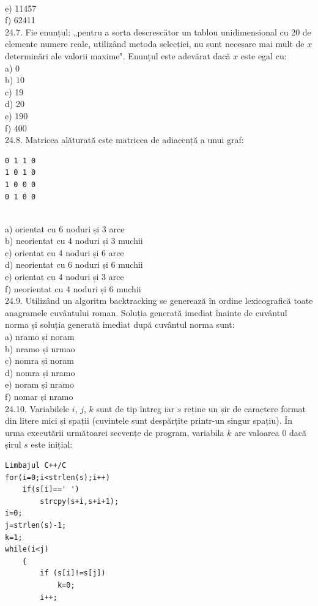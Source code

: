{{\\
e) 11457
\\
f) 62411
\\
24.7. Fie enunțul: „pentru a sorta descrescător un tablou unidimensional cu 20 de elemente numere reale, utilizând metoda selecției, nu sunt necesare mai mult de $x$ determinări ale valorii maxime". Enunțul este adevărat dacă $x$ este egal cu:
\\
a) 0
\\
b) 10
\\
c) 19
\\
d) 20
\\
e) 190
\\
f) 400
\\
24.8. Matricea alăturată este matricea de adiacență a unui graf:
\begin{verbatim}
0 1 1 0
1 0 1 0
1 0 0 0
0 1 0 0
\end{verbatim}
\\
a) orientat cu 6 noduri și 3 arce
\\
b) neorientat cu 4 noduri și 3 muchii
\\
c) orientat cu 4 noduri și 6 arce
\\
d) neorientat cu 6 noduri și 6 muchii
\\
e) orientat cu 4 noduri și 3 arce
\\
f) neorientat cu 4 noduri și 6 muchii
\\
24.9. Utilizând un algoritm backtracking se generează în ordine lexicografică toate anagramele cuvântului roman. Soluția generată imediat înainte de cuvântul norma și soluția generată imediat după cuvântul norma sunt:
\\
a) nramo și noram
\\
b) nramo și nrmao
\\
c) nomra și noram
\\
d) nomra și nramo
\\
e) noram și nramo
\\
f) nomar și nramo
\\
24.10. Variabilele $i$, $j$, $k$ sunt de tip întreg iar $s$ reține un șir de caractere format din litere mici și spații (cuvintele sunt despărțite printr-un singur spațiu). În urma executării următoarei secvențe de program, variabila $k$ are valoarea 0 dacă șirul $s$ este inițial:
\begin{verbatim}
Limbajul C++/C
for(i=0;i<strlen(s);i++)
    if(s[i]==' ')
        strcpy(s+i,s+i+1);
i=0;
j=strlen(s)-1;
k=1;
while(i<j)
    {
        if (s[i]!=s[j])
            k=0;
        i++;

\end{verbatim}}}
